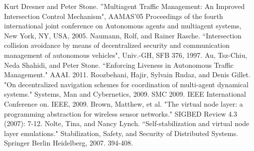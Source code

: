 \documentclass[12pt]{article}
\begin{document}
\begin{thebibliography}{9}

Kurt Dresner and Peter Stone. ''Multiagent Traffic Management: An Improved Intersection
Control Mechanism", AAMAS'05 Proceedings of the fourth international joint conference on Autonomous agents and multiagent systems, New York, NY, USA, 2005.
Naumann, Rolf, and Rainer Rasche. ``Intersection collision avoidance by means of decentralized security and communication management of autonomous vehicles", Univ.-GH, SFB 376, 1997.
Au, Tsz-Chiu, Neda Shahidi, and Peter Stone. ``Enforcing Liveness in Autonomous Traffic Management." AAAI. 2011.
Roozbehani, Hajir, Sylvain Rudaz, and Denis Gillet. "On decentralized navigation schemes for coordination of multi-agent dynamical systems." Systems, Man and Cybernetics, 2009. SMC 2009. IEEE International Conference on. IEEE, 2009.
Brown, Matthew, et al. "The virtual node layer: a programming abstraction for wireless sensor networks." SIGBED Review 4.3 (2007): 7-12.
Nolte, Tina, and Nancy Lynch. ``Self-stabilization and virtual node layer emulations." Stabilization, Safety, and Security of Distributed Systems. Springer Berlin Heidelberg, 2007. 394-408.
\end{thebibliography}
\end{document}
